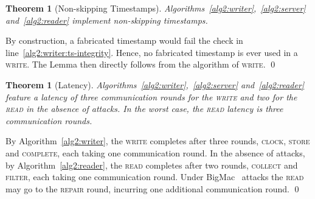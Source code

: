 \documentclass[10pt,conference,compsocconf]{IEEEtran}
\newcommand{\complete}{\textsc{complete}}
\newtheorem{theo}[defn]{Theorem}
\newenvironment{prooff}{\vspace{1ex}\noindent{\bf Proof:}\hspace{0.5em}}
	{\hfill\qed\vspace{1em}}
\begin{document}
\begin{theo}[Non-skipping Timestamps]
Algorithms~\ref{alg2:writer},~\ref{alg2:server} and~\ref{alg2:reader} implement non-skipping timestamps.
\end{theo}
\begin{prooff} By construction, a fabricated timestamp would fail the check in line~\ref{alg2:writer:ts-integrity}. Hence, no fabricated timestamp is ever used in a \textsc{write}. The Lemma then directly follows from the algorithm of \textsc{write}.
\end{prooff}


\begin{theo}[Latency]
Algorithms~\ref{alg2:writer},~\ref{alg2:server} and~\ref{alg2:reader} feature a latency of \emph{three} communication rounds for the \textsc{write} and \emph{two} for the \textsc{read} in the absence of attacks. In the worst case, the \textsc{read} latency is \emph{three} communication rounds.
\end{theo}
\begin{prooff} By Algorithm~\ref{alg2:writer}, the \textsc{write} completes after three rounds, \textsc{clock}, \textsc{store} and \textsc{\complete}, each taking one communication round. In the absence of attacks, by Algorithm~\ref{alg2:reader}, the \textsc{read} completes after two rounds, \textsc{collect} and \textsc{filter}, each taking one communication round. Under BigMac~\cite{CWADM09} attacks the \textsc{read} may go to the \textsc{repair} round, incurring one additional communication round.
\end{prooff}
\end{document}
